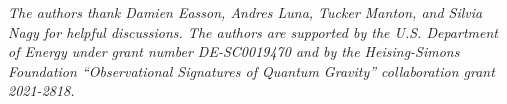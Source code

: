 
\textit{The authors thank Damien Easson, Andres Luna, Tucker Manton, and Silvia Nagy for helpful discussions. The
    authors are supported by the U.S. Department of Energy under grant number DE-SC0019470 and by the
Heising-Simons Foundation “Observational Signatures of Quantum Gravity” collaboration grant 2021-2818.}

\nobibintoc
\printbibliography[heading=subbibliography]
